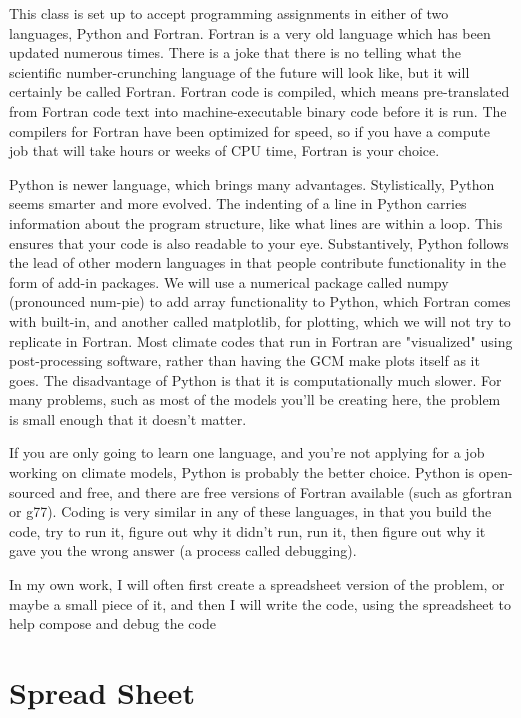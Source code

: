 This class is set up to accept programming assignments in either of two languages, Python and Fortran. Fortran is a very old language which has been updated numerous times. There is a joke that there is no telling what the scientific number-crunching language of the future will look like, but it will certainly be called Fortran. Fortran code is compiled, which means pre-translated from Fortran code text into machine-executable binary code before it is run. The compilers for Fortran have been optimized for speed, so if you have a compute job that will take hours or weeks of CPU time, Fortran is your choice.

Python is newer language, which brings many advantages. Stylistically, Python seems smarter and more evolved. The indenting of a line in Python carries information about the program structure, like what lines are within a loop. This ensures that your code is also readable to your eye. Substantively, Python follows the lead of other modern languages in that people contribute functionality in the form of add-in packages. We will use a numerical package called numpy (pronounced num-pie) to add array functionality to Python, which Fortran comes with built-in, and another called matplotlib, for plotting, which we will not try to replicate in Fortran. Most climate codes that run in Fortran are "visualized" using post-processing software, rather than having the GCM make plots itself as it goes. The disadvantage of Python is that it is computationally much slower. For many problems, such as most of the models you'll be creating here, the problem is small enough that it doesn't matter.

If you are only going to learn one language, and you're not applying for a job working on climate models, Python is probably the better choice. Python is open-sourced and free, and there are free versions of Fortran available (such as gfortran or g77). Coding is very similar in any of these languages, in that you build the code, try to run it, figure out why it didn’t run, run it, then figure out why it gave you the wrong answer (a process called debugging).

In my own work, I will often first create a spreadsheet version of the problem, or maybe a small piece of it, and then I will write the code, using the spreadsheet to help compose and debug the code



\section{Spread Sheet}

